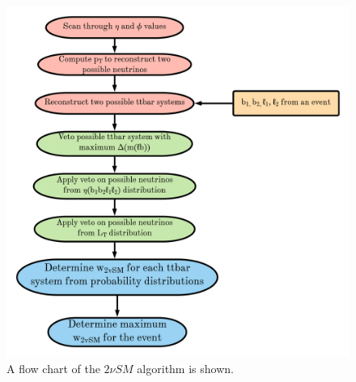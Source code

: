 \begin{figure}[h!]
	\includegraphics[width=0.5\linewidth]{figures/2vsm_flow.png}
	\centering
	\caption{A flow chart of the $2\nu SM$ algorithm is shown.}
	\label{fig:2vsm-flow}
\end{figure}



